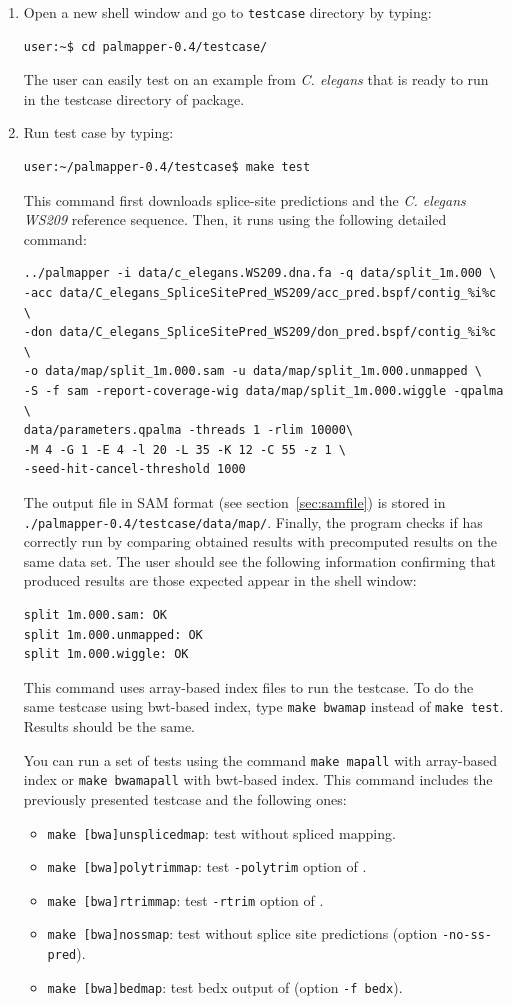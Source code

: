 \documentclass{article}
\begin{document}
\begin{enumerate}
\item Open a new shell window and go to \texttt{testcase} directory by
  typing: 
\begin{verbatim}
user:~$ cd palmapper-0.4/testcase/
\end{verbatim}
The user can easily test \PALMapper{} on an example from
\emph{C. elegans} that is ready to run in the testcase directory of
\PALMapper{} package.
\item Run test case by typing:
\begin{verbatim}
user:~/palmapper-0.4/testcase$ make test
\end{verbatim}
This command first downloads splice-site predictions and the
\emph{C. elegans WS209} reference sequence. Then, it runs \PALMapper{}
using the following detailed command:
\begin{verbatim}
../palmapper -i data/c_elegans.WS209.dna.fa -q data/split_1m.000 \
-acc data/C_elegans_SpliceSitePred_WS209/acc_pred.bspf/contig_%i%c \
-don data/C_elegans_SpliceSitePred_WS209/don_pred.bspf/contig_%i%c \
-o data/map/split_1m.000.sam -u data/map/split_1m.000.unmapped \
-S -f sam -report-coverage-wig data/map/split_1m.000.wiggle -qpalma \
data/parameters.qpalma -threads 1 -rlim 10000\
-M 4 -G 1 -E 4 -l 20 -L 35 -K 12 -C 55 -z 1 \
-seed-hit-cancel-threshold 1000
\end{verbatim}
The output file in SAM format (see section~\ref{sec:samfile}) is
stored in \texttt{./palmapper-0.4/testcase/data/map/}. Finally, the
program checks if \PALMapper{} has correctly run by comparing obtained
results with precomputed results on the same data set. The user should
see the following information confirming that produced results are
those expected appear in the shell window: 

\begin{verbatim}
split 1m.000.sam: OK
split 1m.000.unmapped: OK
split 1m.000.wiggle: OK
\end{verbatim}

This command uses array-based index files to run the testcase. To do
the same testcase using bwt-based index, type \texttt{make bwamap}
instead of \texttt{make test}. Results should be the same.

You can run a set of tests using the command \texttt{make mapall} with
array-based index or \texttt{make bwamapall} with bwt-based
index. This command includes the previously presented testcase and the
following ones:
\begin{itemize}
\item \texttt{make [bwa]unsplicedmap}: test \PALMapper{} without
  spliced mapping.
\item \texttt{make [bwa]polytrimmap}: test \texttt{-polytrim} option
  of \PALMapper{}.
\item \texttt{make [bwa]rtrimmap}: test \texttt{-rtrim} option
  of \PALMapper{}.
\item \texttt{make [bwa]nossmap}: test \PALMapper{} without splice
  site predictions (option \texttt{-no-ss-pred}).
\item \texttt{make [bwa]bedmap}: test bedx output of \PALMapper{}
  (option \texttt{-f bedx}).
\end{itemize}


\end{enumerate}
\end{document}
